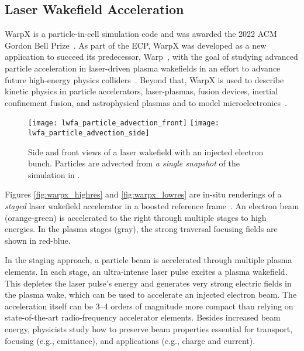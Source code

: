 \subsection{Laser Wakefield Acceleration}\label{sec:warpx}

%
%
WarpX is a particle-in-cell simulation code and was awarded the 2022 ACM Gordon Bell Prize~\citep{FedeliHuebl2022}.
As part of the ECP, WarpX was developed as a new application to succeed its predecessor, Warp~\citep{Vay2013}, with the goal of studying advanced particle acceleration in laser-driven plasma wakefields in an effort to advance future high-energy physics colliders~\citep{Albert2021}.
Beyond that, WarpX is used to describe kinetic physics in particle accelerators, laser-plasmas, fusion devices, inertial confinement fusion, and astrophysical plasmas and to model microelectronics~\citep{Yao2022}.

\begin{figure*}[ht]
  \centering
  \texttt{[image: lwfa\_particle\_advection\_front]}%
  \texttt{[image: lwfa\_particle\_advection\_side]}
  \caption{Side and front views of a laser wakefield with an injected electron bunch.
  Particles are advected from \emph{a single snapshot} of the simulation in \vtkm.}
  \label{fig:lwfa_particle_advection}
\end{figure*}

Figures \ref{fig:warpx_highres} and \ref{fig:warpx_lowres} are in-situ renderings of a \emph{staged} laser wakefield accelerator in a boosted reference frame~\citep{Vay2011}.
An electron beam (orange-green) is accelerated to the right through multiple stages to high energies.
In the plasma stages (gray), the strong traversal focusing fields are shown in red-blue.

In the staging approach, a particle beam is accelerated through multiple plasma elements.
In each stage, an ultra-intense laser pulse excites a plasma wakefield.
This depletes the laser pulse's energy and generates very strong electric fields in the plasma wake, which can be used to accelerate an injected electron beam.
The acceleration itself can be 3--4 orders of magnitude more compact than relying on state-of-the-art radio-frequency accelerator elements.
Besides increased beam energy, physicists study how to preserve beam properties essential for transport, focusing (e.g., emittance), and applications (e.g., charge and current).

